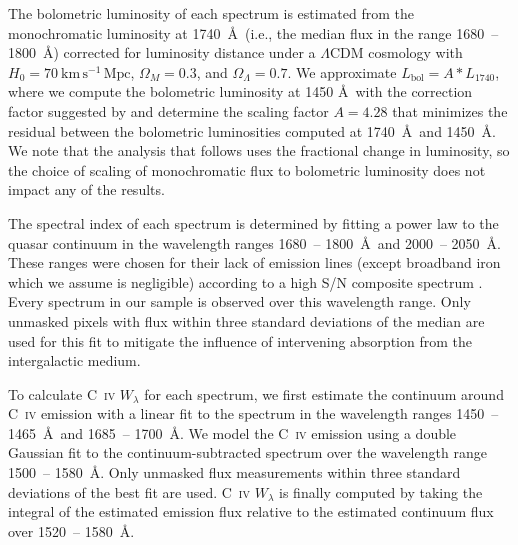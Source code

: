\documentclass[11pt,a4paper]{article}
\begin{document}
The bolometric luminosity of each spectrum is estimated from the
monochromatic luminosity at 1740~\AA\ (i.e., the median flux in the
range 1680~-- 1800~\AA) corrected for luminosity distance under a
$\Lambda \mathrm{CDM}$ cosmology with $H_0 = 70\ \mathrm{km \, s^{-1}
\, Mpc}$, $\Omega_{M} = 0.3$, and $\Omega_{\Lambda} = 0.7$. We
approximate $L_{\mathrm{bol}}=A*L_{1740}$, where we compute the
bolometric luminosity at 1450 \AA\ with the correction factor
suggested by \citet{Runnoe2012, Runnoe2012Erratum} and determine the scaling factor
$A=4.28$ that minimizes the residual between the bolometric
luminosities computed at 1740~\AA\ and 1450~\AA.  We note that the
analysis that follows uses the fractional change in luminosity, so the
choice of scaling of monochromatic flux to bolometric luminosity does
not impact any of the results.

The spectral index of each spectrum is determined by fitting a power
law to the quasar continuum in the wavelength ranges 1680~-- 1800~\AA\
and 2000~-- 2050~\AA. These ranges were chosen for their lack of
emission lines (except broadband iron which we assume is negligible)
according to a high S/N composite spectrum \citep{Harris2016}. Every
spectrum in our sample is observed over this wavelength range. Only
unmasked pixels with flux within three standard deviations of the
median are used for this fit to mitigate the influence of intervening
absorption from the intergalactic medium.

To calculate \textsc{C~iv} $W_\lambda$ for each spectrum, we first
estimate the continuum around \textsc{C~iv} emission with a linear fit
to the spectrum in the wavelength ranges 1450~-- 1465~\AA\ and 1685~--
1700~\AA. We model the \textsc{C~iv} emission using a double Gaussian
fit to the continuum-subtracted spectrum over the wavelength range
1500~-- 1580~\AA. Only unmasked flux measurements within three
standard deviations of the best fit are used. \textsc{C~iv}
$W_\lambda$ is finally computed by taking the integral of the
estimated emission flux relative to the estimated continuum flux over
1520~-- 1580~\AA.






\end{document}
